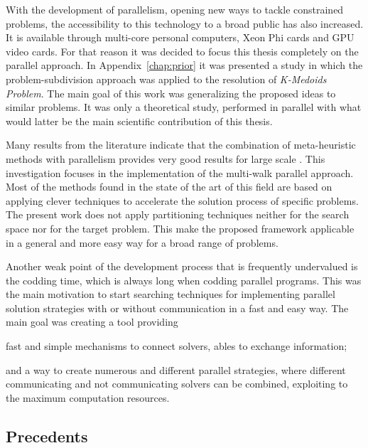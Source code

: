 With the development of parallelism, opening new ways to tackle constrained problems, the accessibility to this technology to a broad public has also increased. It is available through multi-core personal computers, Xeon Phi cards and GPU video cards. For that reason it was decided to focus this thesis completely on the parallel approach. In Appendix~\ref{chap:prior} it was presented a study in which the problem-subdivision approach was applied to the resolution of {\it K-Medoids Problem}. The main goal of this work was generalizing the proposed ideas to similar problems. It was only a theoretical study, performed in parallel with what would latter be the main scientific contribution of this thesis.

Many results from the literature indicate that the combination of meta-heuristic methods with parallelism provides very good results for large scale \csps. This investigation focuses in the implementation of the multi-walk parallel approach. Most of the methods found in the state of the art of this field are based on applying clever techniques to accelerate the solution process of specific problems. The present work does not apply partitioning techniques neither for the search space nor for the target problem. This make the proposed framework applicable in a general and more easy way for a broad range of problems.

Another weak point of the development process that is frequently undervalued is the codding time, which is always long when codding parallel programs. This was the main motivation to start searching techniques for implementing parallel solution strategies with or without communication in a fast and easy way. The main goal was creating a tool providing 
\begin{inparaenum}[1-]
\item fast and simple mechanisms to connect solvers, ables to exchange information; 
\item and a way to create numerous and different parallel strategies, where different communicating and not communicating solvers can be combined, exploiting to the maximum computation resources.
\end{inparaenum}

\subsection{Precedents}

